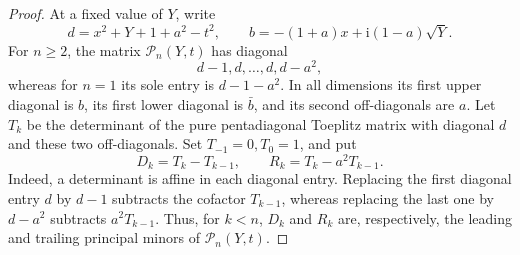\documentclass[a4paper,preprint,12pt,nopreprintline,sort&compress]{elsarticle}
\numberwithin{equation}{section}
\theoremstyle{remark}
\newcommand{\ii}{\mathrm i}
\begin{document}
\begin{proof}
At a fixed value of \(Y\), write
\[
 d=x^2+Y+1+a^2-t^2,
 \qquad b=-(1+a)x+\ii(1-a)\sqrt Y.
\]
For \(n\geq2\), the matrix \(\mathcal P_n(Y,t)\) has diagonal
\[
 d-1,d,\ldots,d,d-a^2,
\]
whereas for \(n=1\) its sole entry is \(d-1-a^2\).  In all dimensions
its first upper diagonal is \(b\), its first lower diagonal is \(\bar b\),
and its second off-diagonals are \(a\).  Let \(T_k\) be the determinant of
the pure pentadiagonal Toeplitz matrix with diagonal \(d\) and these two
off-diagonals.  Set \(T_{-1}=0,T_0=1\), and put
\begin{equation}\label{eq:D-R-def}
 D_k=T_k-T_{k-1},\qquad R_k=T_k-a^2T_{k-1}.
\end{equation}
Indeed, a determinant is affine in each diagonal entry.  Replacing the
first diagonal entry \(d\) by \(d-1\) subtracts the cofactor
\(T_{k-1}\), whereas replacing the last one by \(d-a^2\) subtracts
\(a^2T_{k-1}\).  Thus, for \(k<n\), \(D_k\) and \(R_k\) are,
respectively, the leading and trailing principal minors of
\(\mathcal P_n(Y,t)\).


\end{proof}
\end{document}
